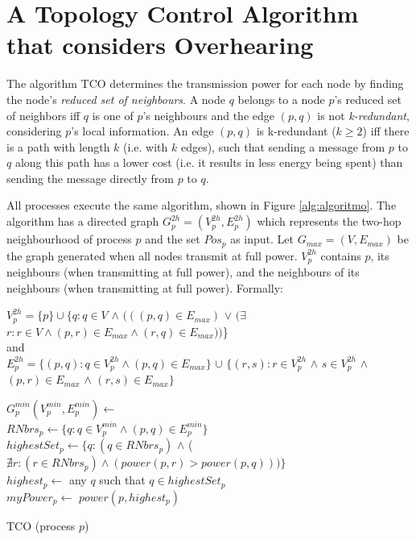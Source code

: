 \documentclass{llncs}
\begin{document}
\section{A Topology Control Algorithm that considers Overhearing}
\label{sec-algorithm}

The algorithm TCO determines the transmission power for each node by finding the node's \textit{reduced set of neighbours}. A node $q$ belongs to a node $p$'s reduced set of neighbors iff $q$ is one of $p$'s neighbours and the edge $(p, q)$ is not \emph{k-redundant}, considering $p$'s local information. 
An edge $(p, q)$ is k-redundant ($k \ge 2$) iff there is a path with length $k$
(i.e. with $k$ edges), such that sending a message from $p$ to $q$ along this path
has a lower cost (i.e. it results in less energy being spent) than sending the message directly from $p$ to $q$. 

All processes execute the same algorithm, shown in Figure \ref{alg:algoritmo}.
The algorithm has a directed graph $G^{2h}_p=(V^{2h}_p, E^{2h}_p)$ which represents the two-hop neighbourhood of process $p$ 
and the set $Pos_p$ as input. Let $G_{max}=(V, E_{max})$ be the graph generated when all nodes transmit at full power. $V^{2h}_p$ contains 
$p$, its neighbours (when transmitting at full power), and the neighbours of its neighbours (when transmitting at full power). Formally:
\begin{center}
$V_p^{2h}=\{p\} \cup \{ q  : q \in V$ $\land$ $(((p, q) \in E_{max})$ $\lor$ \linebreak 
$(\exists$ $r : r \in V \land (p, r) \in E_{max} \land (r, q) \in E_{max}))$\}  \\
and \\
$E_p^{2h}=\{ (p, q) : q \in V_p^{2h} \land (p, q) \in E_{max}\}$ $\cup$ \linebreak
{} $\{(r, s) : r \in V_p^{2h}$ $\land$ $s \in V_p^{2h}$ $\land$ 
	$(p, r) \in E_{max}$ $\land$ $(r, s) \in E_{max}\}$
\end{center}

\begin{algorithm}
\BlankLine
 $G_p^{min}(V_p^{min}, E_p^{min}) \gets $   \FuncSty{)}\\
  $RNbrs_p \gets \lbrace q:q \in V_p^{min} \wedge (p,q) \in E_p^{min} \rbrace$ \\
  $highestSet_p \gets \{q : (q \in RNbrs_p)$ $\land$ 
           \hspace*{2.7cm} ($\nexists r : (r \in RNbrs_p) \land (power(p, r) > power(p, q)))\}$ \\
  $highest_p \gets$ any $q$ such that $q \in highestSet_p$ \\
  $myPower_p \gets $ $power(p, highest_p)$
\caption{TCO (process $p$)} 
\label{alg:algoritmo}
\end{algorithm} 
\end{document}
